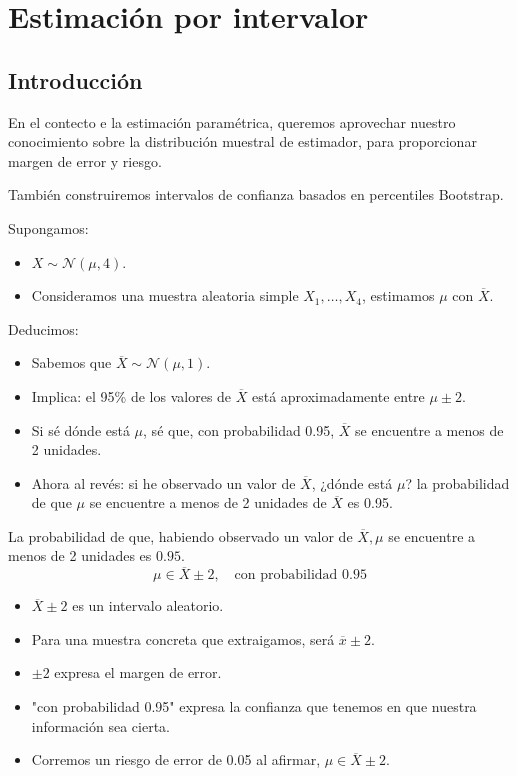 \section{Estimación por intervalor}
\subsection{Introducción}
\begin{tcolorbox}[colback=blue!5!white, colframe=blue!75!black, title=\textbf{Estimación paramétrica}]
En el contecto e la estimación paramétrica, queremos aprovechar nuestro conocimiento sobre la distribución muestral de estimador, para proporcionar margen de error y riesgo.
\end{tcolorbox}
\begin{tcolorbox}[colback=blue!5!white, colframe=blue!75!black, title=\textbf{Bootstrap}]
También construiremos intervalos de confianza basados en percentiles Bootstrap.
\end{tcolorbox}
\begin{tcolorbox}[colback=red!5!white, colframe=red!75!black, title=\textbf{Idea básica}]
Supongamos:
\begin{itemize}[label=\textbullet]
    \item $X\sim \mathcal{N}(\mu,4)$.
    \item Consideramos una muestra aleatoria simple $X_1,\dots,X_4$, estimamos $\mu$ con $\overline{X}$.
\end{itemize}
Deducimos:
\begin{itemize}[label=\textbullet]
    \item Sabemos que $\overline{X}\sim \mathcal{N}(\mu,1)$.
    \item Implica: el 95\% de los valores de $\overline{X}$ está aproximadamente entre $\mu\pm 2$.
    \item Si sé dónde está $\mu$, sé que, con probabilidad 0.95, $\overline{X}$ se encuentre a menos de 2 unidades.
    \item Ahora al revés: si he observado un valor de $\overline{X}$, ¿dónde está $\mu$? la probabilidad de que $\mu$ se encuentre a menos de 2 unidades de $\overline{X}$ es 0.95.
\end{itemize}
\end{tcolorbox}
La probabilidad de que, habiendo observado un valor de $\overline{X},\mu$ se encuentre a menos de 2 unidades es $0.95$.
 \[
\mu\in \overline{X}\pm 2,\quad \text{con probabilidad 0.95}
\] 
\begin{itemize}[label=\textbullet]
    \item $\overline{X}\pm 2$ es un intervalo aleatorio.
    \item Para una muestra concreta que extraigamos, será $\overline{x}\pm 2$.
    \item $\pm 2$ expresa el margen de error.
    \item "con probabilidad 0.95" expresa la confianza que tenemos en que nuestra información sea cierta.
    \item Corremos un riesgo de error de 0.05 al afirmar,  $\mu\in \overline{X}\pm 2$.
\end{itemize}
